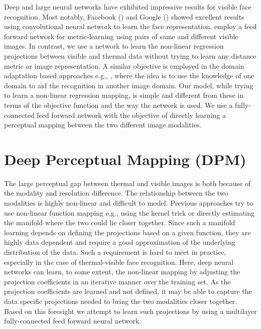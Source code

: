\documentclass[smallextended,natbib]{svjour3}       \usepackage{graphicx}
\begin{document}
Deep and large neural networks have exhibited impressive results for visible face recognition. Most notably, Facebook (\cite{taigman2014}) and Google (\cite{schroff2015facenet}) showed excellent results using convolutional neural network to learn the face representation. \cite{hu2014discriminative} employ a feed forward network for metric-learning using pairs of same and different visible images. In contrast, we use a  network to learn the non-linear regression projections between visible and thermal data without trying to learn any distance metric or image representation. A similar objective is employed in the domain adaptation based approaches e.g., \cite{ganin2014}, where the idea is to use the knowledge of one domain to aid the recognition in another image domain. Our model, while trying to learn a non-linear regression mapping, is simple and different from these in terms of the objective function and the way the network is used. We use a fully-connected feed forward network with the objective of directly learning a perceptual mapping between the two different image modalities. 

\section{Deep Perceptual Mapping (DPM)}
\label{DPM}
The large perceptual gap between thermal and visible images is both because of the modality and resolution difference. The relationship between the two modalities is highly non-linear and difficult to model. Previous approaches try to use non-linear function mapping e.g., using the kernel trick or directly estimating the manifold where the two could lie closer together. Since such a manifold learning depends on defining the projections based on a given function, they are highly data dependent and require a good approximation of the underlying distribution of the data. Such a requirement is hard to meet in practice, especially in the case of thermal-visible face recognition. Here, deep neural networks can learn, to some extent, the non-linear mapping by adjusting the projection coefficients in an iterative manner over the training set. As the projection coefficients are learned and not defined, it may be able to capture the data specific projections needed to bring the two modalities closer together. Based on this foresight we attempt to learn such projections by using a multilayer fully-connected feed forward neural network. 
\end{document}
